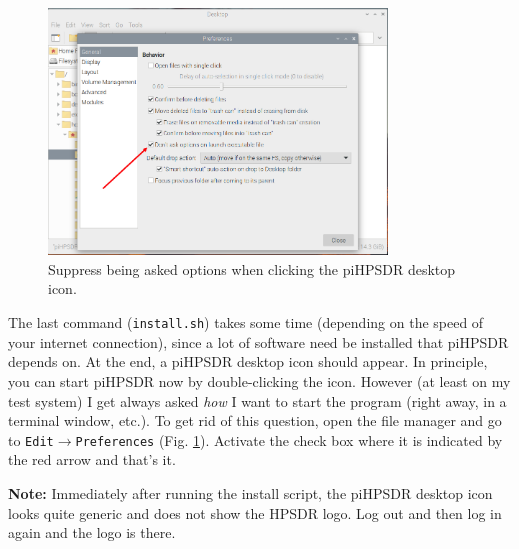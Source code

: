 \documentclass[12pt]{book}
\begin{document}
\begin{center}
\end{center}


\begin{figure}[ht]
\center
\includegraphics[width=9cm]{piDontAsk.png}
\caption{Suppress being asked options when clicking the piHPSDR desktop icon.}
\label{fig:piDontAsk}
\end{figure}

The last command  (\texttt{install.sh}) takes some time (depending on the speed of your internet connection),
since a lot of software need be installed that piHPSDR depends on. At the end, a piHPSDR desktop
icon should appear. In principle, you can start piHPSDR now by double-clicking the icon.
However (at least on my test system) I get always asked \textit{how} I want to
start the program (right away, in a terminal window, etc.). 
To get rid of this question, open the file manager
and go to
\texttt{Edit}$\to$\texttt{Preferences} (Fig. \ref{fig:piDontAsk}). Activate the check
box where it is indicated by the red arrow and that's it.


\textbf{Note:} Immediately after running the install script, the piHPSDR desktop icon
looks quite generic and does not show the HPSDR logo. Log out and then log in again
and the logo is there.
\end{document}
